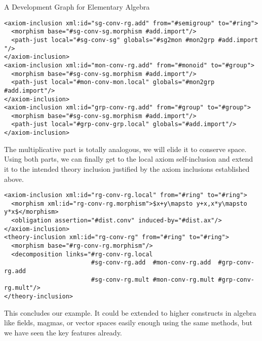 \begin{tchapter}[id=dg-elal]{A Development Graph for Elementary Algebra}
\begin{lstlisting}[mathescape,index={axiom-inclusion,theory-inclusion}]
<axiom-inclusion xml:id="sg-conv-rg.add" from="#semigroup" to="#ring">
  <morphism base="#sg-conv-sg.morphism #add.import"/>
  <path-just local="#sg-conv-sg" globals="#sg2mon #mon2grp #add.import "/>
</axiom-inclusion>
<axiom-inclusion xml:id="mon-conv-rg.add" from="#monoid" to="#group">
  <morphism base="#sg-conv-sg.morphism #add.import"/>
  <path-just local="#mon-conv-mon.local" globals="#mon2grp #add.import"/>
</axiom-inclusion>
<axiom-inclusion xml:id="grp-conv-rg.add" from="#group" to="#group">
  <morphism base="#sg-conv-sg.morphism #add.import"/>
  <path-just local="#grp-conv-grp.local" globals="#add.import"/>
</axiom-inclusion>
\end{lstlisting}
The multiplicative part is totally analogous, we will elide it to conserve space.
Using both parts, we can finally get to the local axiom self-inclusion and extend
it to the intended theory inclusion justified by the axiom inclusions established
above.
\begin{lstlisting}[mathescape,index={axiom-inclusion,theory-inclusion}]
<axiom-inclusion xml:id="rg-conv-rg.local" from="#ring" to="#ring">
  <morphism xml:id="rg-conv-rg.morphism">$x+y\mapsto y+x,x*y\mapsto y*x$</morphism>
  <obligation assertion="#dist.conv" induced-by="#dist.ax"/>
</axiom-inclusion>  
<theory-inclusion xml:id="rg-conv-rg" from="#ring" to="#ring">
  <morphism base="#rg-conv-rg.morphism"/>
  <decomposition links="#rg-conv-rg.local 
                        #sg-conv-rg.add  #mon-conv-rg.add  #grp-conv-rg.add
                        #sg-conv-rg.mult #mon-conv-rg.mult #grp-conv-rg.mult"/>
</theory-inclusion>  
\end{lstlisting}
This concludes our example. It could be extended to higher constructs in algebra
like fields, magmas, or vector spaces easily enough using the same methods, but
we have seen the key features already.
\end{tchapter}

 

